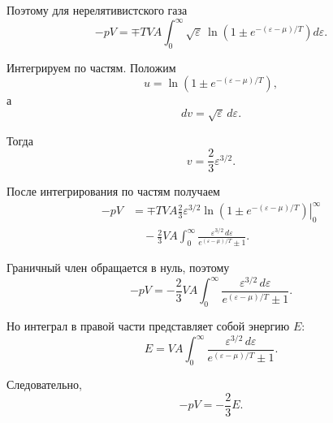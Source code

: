 \documentclass[../final.tex]{subfiles}
\begin{document}
Поэтому для нерелятивистского газа
%
\begin{equation*}
    -pV
    =
    \mp TVA
    \int_0^\infty
    \sqrt{\varepsilon}\,
    \ln
    \left(
        1
        \pm
        e^{-(\varepsilon-\mu)/T}
    \right)
    d\varepsilon.
\end{equation*}

Интегрируем по частям. Положим
%
\begin{equation*}
    u
    =
    \ln
    \left(
        1
        \pm
        e^{-(\varepsilon-\mu)/T}
    \right),
\end{equation*}
%
а
%
\begin{equation*}
    dv
    =
    \sqrt{\varepsilon}\,
    d\varepsilon.
\end{equation*}

Тогда
%
\begin{equation*}
    v
    =
    \frac{2}{3}
    \varepsilon^{3/2}.
\end{equation*}

После интегрирования по частям получаем
%
\begin{align*}
    -pV
    &=
    \left.
        \mp
        TVA
        \frac{2}{3}
        \varepsilon^{3/2}
        \ln
        \left(
            1
            \pm
            e^{-(\varepsilon-\mu)/T}
        \right)
    \right|_0^\infty
    \\[6pt]
    &\quad
    -
    \frac{2}{3}
    VA
    \int_0^\infty
    \frac{
        \varepsilon^{3/2}\,
        d\varepsilon
    }{
        e^{(\varepsilon-\mu)/T}\pm1
    }.
\end{align*}

Граничный член обращается в нуль, поэтому
%
\begin{equation*}
    -pV
    =
    -
    \frac{2}{3}
    VA
    \int_0^\infty
    \frac{
        \varepsilon^{3/2}\,
        d\varepsilon
    }{
        e^{(\varepsilon-\mu)/T}\pm1
    }.
\end{equation*}

Но интеграл в правой части представляет собой энергию $E$:
%
\begin{equation*}
    E
    =
    VA
    \int_0^\infty
    \frac{
        \varepsilon^{3/2}\,
        d\varepsilon
    }{
        e^{(\varepsilon-\mu)/T}\pm1
    }.
\end{equation*}

Следовательно,
%
\begin{equation*}
    -pV
    =
    -\frac{2}{3}E.
\end{equation*}
\end{document}
